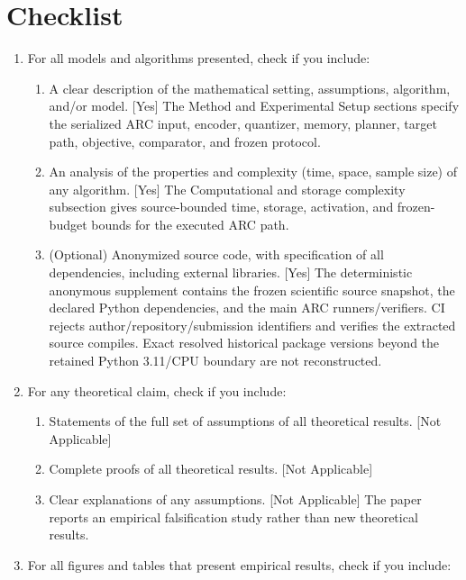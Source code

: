 \section*{Checklist}
\begin{enumerate}[leftmargin=*]
\item For all models and algorithms presented, check if you include:
  \begin{enumerate}
    \item A clear description of the mathematical setting, assumptions, algorithm, and/or model. [Yes] The Method and Experimental Setup sections specify the serialized ARC input, encoder, quantizer, memory, planner, target path, objective, comparator, and frozen protocol.
    \item An analysis of the properties and complexity (time, space, sample size) of any algorithm. [Yes] The Computational and storage complexity subsection gives source-bounded time, storage, activation, and frozen-budget bounds for the executed ARC path.
    \item (Optional) Anonymized source code, with specification of all dependencies, including external libraries. [Yes] The deterministic anonymous supplement contains the frozen scientific source snapshot, the declared Python dependencies, and the main ARC runners/verifiers. CI rejects author/repository/submission identifiers and verifies the extracted source compiles. Exact resolved historical package versions beyond the retained Python 3.11/CPU boundary are not reconstructed.
  \end{enumerate}
\item For any theoretical claim, check if you include:
  \begin{enumerate}
    \item Statements of the full set of assumptions of all theoretical results. [Not Applicable]
    \item Complete proofs of all theoretical results. [Not Applicable]
    \item Clear explanations of any assumptions. [Not Applicable] The paper reports an empirical falsification study rather than new theoretical results.
  \end{enumerate}
\item For all figures and tables that present empirical results, check if you include:
  \begin{enumerate}

\end{enumerate}
\end{enumerate}
